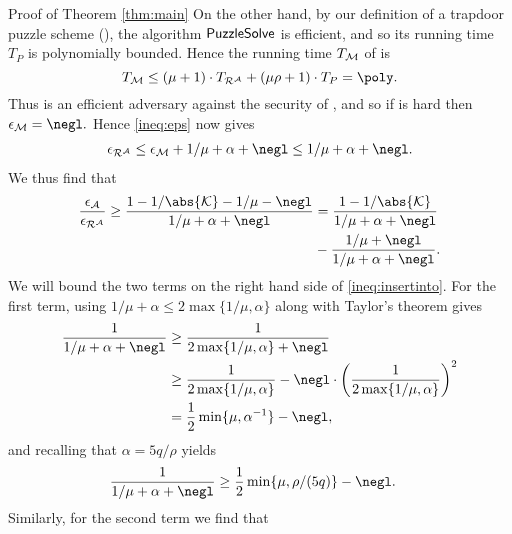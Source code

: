 \begin{namedproof}{Proof of Theorem \ref{thm:main}}
  On the other hand, by our definition of a trapdoor puzzle scheme (),
  the algorithm \(\mathsf{PuzzleSolve}\) is efficient,
  and so its running time \(T_{P}\) is polynomially bounded.
  Hence the running time \(T_{\mathcal{M}}\) of \redM is
  \[
    T_{\redM} \le (\mu + 1) \cdot T_{\redR^{\advA}} + (\mu \rho + 1) \cdot T_{P}
    = \poly.
  \]
  Thus \redM is an efficient adversary against the \SICA security of \Simple,
  and so if \Simple is hard then
  \(
    \epsilon_{\redM} = \negl.
  \)
  Hence \eqref{ineq:eps} now gives
  \begin{align}
    \epsilon_{\redR^{\advA}} \le  \epsilon_{\redM} + 1/\mu + \alpha + \negl \le 1/\mu + \alpha + \negl. \notag
  \end{align}
  We thus find that
  \begin{align}\label{ineq:insertinto}
    \frac{\epsilon_{\advA}}{\epsilon_{\redR^{\advA}}} \ge \frac{1 - 1 / \abs{\keyspace} - 1 / \mu - \negl}{1 / \mu + \alpha + \negl}
    & = \frac{1 - 1 / \abs{\keyspace}}{1 / \mu + \alpha + \negl}\\
    & - \frac{1/\mu + \negl}{1/\mu + \alpha + \negl}. \notag
  \end{align}
  We will bound the two terms on the right hand side of \eqref{ineq:insertinto}.
  For the first term, using \(1/\mu + \alpha \le 2 \max \{1/\mu, \alpha\}\)
  along with Taylor's theorem gives
  \begin{align}
    \frac{1}{1/\mu + \alpha + \negl}
    & \ge \frac{1}{2 \max \{1 /\mu, \alpha\} + \negl} \notag \\
    & \ge \frac{1}{2 \max \{1 /\mu, \alpha\}} - \negl \cdot \left(  \frac{1}{2 \max \{1 /\mu, \alpha\}} \right)^{2} \notag \\
    & = \frac{1}{2} \min \{ \mu, \alpha^{-1}\} - \negl, \notag
  \end{align}
  and recalling that \(\alpha = 5q / \rho\) yields
  \begin{align}\label{ineq:insertthis1}
    \frac{1}{1/\mu + \alpha + \negl}
    & \ge \frac{1}{2} \min \{ \mu, \rho / (5q)\} - \negl.
  \end{align}
  Similarly, for the second term we find that
  \begin{align}\label{ineq:insertthis2}

\end{align}
\end{namedproof}
